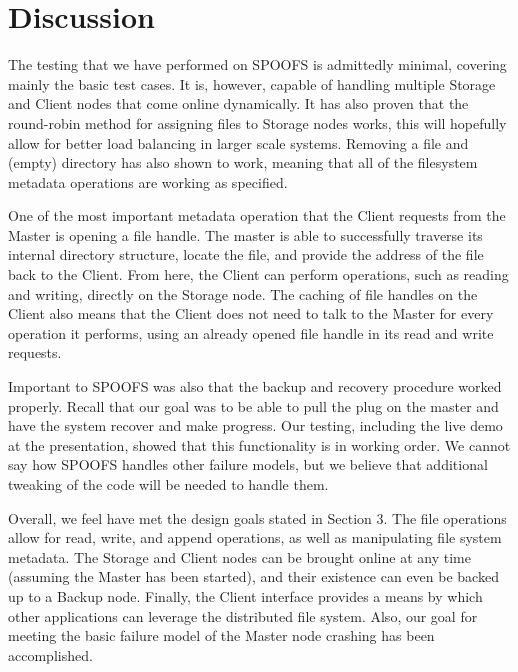 \section{Discussion}
\label{sec:discussion}

The testing that we have performed on SPOOFS is admittedly minimal, covering mainly the basic test cases.  It is, however, capable of handling multiple Storage and Client nodes that come online dynamically.  It has also proven that the round-robin method for assigning files to Storage nodes works, this will hopefully allow for better load balancing in larger scale systems.  Removing a file and (empty) directory has also shown to work, meaning that all of the filesystem metadata operations are working as specified.  

One of the most important metadata operation that the Client requests from the Master is opening a file handle.  The master is able to successfully traverse its internal directory structure, locate the file, and provide the address of the file back to the Client.  From here, the Client can perform operations, such as reading and writing, directly on the Storage node.  The caching of file handles on the Client also means that the Client does not need to talk to the Master for every operation it performs, using an already opened file handle in its read and write requests.

Important to SPOOFS was also that the backup and recovery procedure worked properly.  Recall that our goal was to be able to pull the plug on the master and have the system recover and make progress.  Our testing, including the live demo at the presentation, showed that this functionality is in working order.  We cannot say how SPOOFS handles other failure models, but we believe that additional tweaking of the code will be needed to handle them.

Overall, we feel have met the design goals stated in Section 3.  The file operations allow for read, write, and append operations, as well as manipulating file system metadata.  The Storage and Client nodes can be brought online at any time (assuming the Master has been started), and their existence can even be backed up to a Backup node.  Finally, the Client interface provides a means by which other applications can leverage the distributed file system.  Also, our goal for meeting the basic failure model of the Master node crashing has been accomplished.

